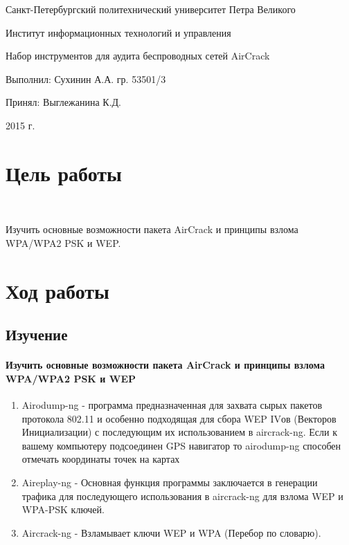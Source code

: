 \documentclass{article}
\begin{document}
\begin{titlepage} \begin{center}

	\Large			
Санкт-Петербургский политехнический университет Петра Великого
			
	\vspace{0.2cm}	
Институт информационных технологий и управления
		
	\vspace{2cm} \vfill \huge
Набор инструментов для аудита беспроводных сетей AirCrack
		
	\vfill 
	\begin{flushleft} \large \hangindent=8cm 
Выполнил: Сухинин А.А. гр. 53501/3 \hrulefill
			
Принял: Выглежанина К.Д. \hrulefill
	\end{flushleft}
		
	\vspace{2cm} \vfill \LARGE
2015 г.
		
\end{center} \end{titlepage}

\section{Цель работы}
~

Изучить основные возможности пакета AirCrack и принципы взлома WPA/WPA2 PSK и WEP.

\section{Ход работы}
\subsection{Изучение}

\paragraph{Изучить основные возможности пакета AirCrack и принципы взлома WPA/WPA2 PSK и WEP}

\begin{enumerate}
\item Airodump-ng - программа предназначенная для захвата сырых пакетов протокола 802.11 и особенно подходящая для сбора WEP IVов (Векторов Инициализации) с последующим их использованием в aircrack-ng. Если к вашему компьютеру подсоединен GPS навигатор
то airodump-ng способен отмечать координаты точек на картах

\item Aireplay-ng - Основная функция программы заключается в генерации трафика для последующего использования в aircrack-ng для взлома WEP и WPA-PSK ключей.

\item Aircrack-ng - Взламывает ключи WEP и WPA (Перебор по словарю).
\end{enumerate}
\end{document}
